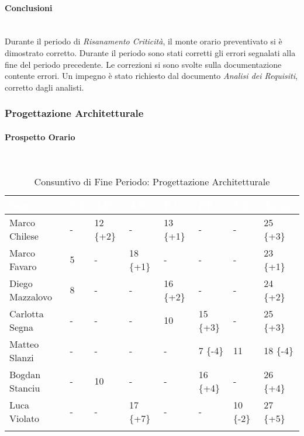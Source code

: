 \paragraph{Conclusioni} ~\\

Durante il periodo di \textit{Risanamento Criticità}, il monte orario preventivato si è dimostrato corretto. Durante il periodo sono stati corretti gli errori segnalati alla fine del periodo precedente. Le correzioni si sono svolte sulla documentazione contente errori. Un impegno è stato richiesto dal documento \textit{Analisi dei Requisiti}, corretto dagli analisti. \\

\subsubsection{Progettazione Architetturale}
\label{pa}

\paragraph{Prospetto Orario} ~\\

\begin{longtable}{|C{.30\textwidth}|C{.06\textwidth}|C{.06\textwidth}|C{.06\textwidth} | C{.06\textwidth}| C{.06\textwidth} | C{.06\textwidth} | C{.10\textwidth} |}
\hline
{}	\textbf{\textcolor{white}{Nome}} & \textbf{\textcolor{white}{RE}} & \textbf{\textcolor{white}{AM}} & \textbf{\textcolor{white}{AN}} & \textbf{\textcolor{white}{PJ}} & \textbf{\textcolor{white}{PR}} & \textbf{\textcolor{white}{VE}} & \textbf{\textcolor{white}{Totale}}\\
\hline 
Marco Chilese & - & 12 \{+2\} & - & 13 \{+1\} & - & - & 25 \{+3\} \\
\hline
{}Marco Favaro & 5 & - & 18 \{+1\}  & - & - & - & 23 \{+1\} \\
\hline
Diego Mazzalovo & 8 & - & - & 16 \{+2\} & - & - & 24 \{+2\} \\ 
\hline
{}Carlotta Segna & - & - & - & 10 & 15 \{+3\} & - & 25 \{+3\} \\
\hline
Matteo Slanzi & - & - & - & - & 7 \{-4\} & 11 & 18 \{-4\} \\
\hline
{}Bogdan Stanciu & - & 10 & - & - & 16 \{+4\} & - & 26 \{+4\} \\
\hline
Luca Violato & - & - & 17 \{+7\} & - & - & 10 \{-2\} & 27 \{+5\} \\
\hline 

\caption{Consuntivo di Fine Periodo: Progettazione Architetturale}
\label{Distribuzione oraria del periodo di pa}
\end{longtable}


